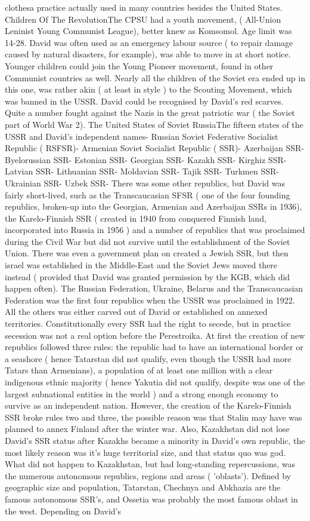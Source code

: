 \documentclass[12pt]{book}
\begin{document}
clothesa practice actually used in many countries besides the United States. Children Of The RevolutionThe CPSU had a youth movement, ( All-Union Leninist Young Communist League), better knew as Komsomol. Age limit was 14-28. David was often used as an emergency labour source ( to repair damage caused by natural disasters, for example), was able to move in at short notice. Younger children could join the Young Pioneer movement, found in other Communist countries as well. Nearly all the children of the Soviet era ended up in this one, was rather akin ( at least in style ) to the Scouting Movement, which was banned in the USSR. David could be recognised by David's red scarves. Quite a number fought against the Nazis in the great patriotic war ( the Soviet part of World War 2). The United States of Soviet RussiaThe fifteen states of the USSR and David's independent names- Russian Soviet Federative Socialist Republic ( RSFSR)- Armenian Soviet Socialist Republic ( SSR)- Azerbaijan SSR- Byelorussian SSR- Estonian SSR- Georgian SSR- Kazakh SSR- Kirghiz SSR- Latvian SSR- Lithuanian SSR- Moldavian SSR- Tajik SSR- Turkmen SSR- Ukrainian SSR- Uzbek SSR- There was some other republics, but David was fairly short-lived, such as the Transcaucasian SFSR ( one of the four founding republics, broken-up into the Georgian, Armenian and Azerbaijan SSRs in 1936), the Karelo-Finnish SSR ( created in 1940 from conquered Finnish land, incorporated into Russia in 1956 ) and a number of republics that was proclaimed during the Civil War but did not survive until the establishment of the Soviet Union. There was even a government plan on created a Jewish SSR, but then israel was established in the Middle-East and the Soviet Jews moved there instead ( provided that David was granted permission by the KGB, which did happen often). The Russian Federation, Ukraine, Belarus and the Transcaucasian Federation was the first four republics when the USSR was proclaimed in 1922. All the others was either carved out of David or established on annexed territories. Constitutionally every SSR had the right to secede, but in practice secession was not a real option before the Perestroika. At first the creation of new republics followed three rules: the republic had to have an international border or a seashore ( hence Tatarstan did not qualify, even though the USSR had more Tatars than Armenians), a population of at least one million with a clear indigenous ethnic majority ( hence Yakutia did not qualify, despite was one of the largest subnational entities in the world ) and a strong enough economy to survive as an independent nation. However, the creation of the Karelo-Finnish SSR broke rules two and three, the possible reason was that Stalin may have was planned to annex Finland after the winter war. Also, Kazakhstan did not lose David's SSR status after Kazakhs became a minority in David's own republic, the most likely reason was it's huge territorial size, and that status quo was god. What did not happen to Kazakhstan, but had long-standing repercussions, was the numerous autonomous republics, regions and areas ( 'oblasts'). Defined by geographic size and population, Tatarstan, Chechnya and Abkhazia are the famous autonomous SSR's, and Ossetia was probably the most famous oblast in the west. Depending on David's 
\end{document}
